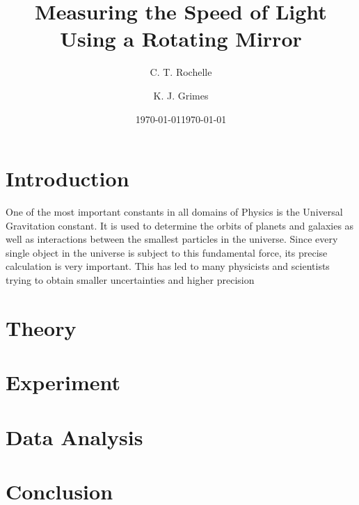 \documentclass[aps,prl,10pt,twocolumn,floatfix]{revtex4-2}
\begin{document}


\title{Measuring the Speed of Light Using a Rotating Mirror}
\author{C. T. Rochelle}
\author{K. J. Grimes}
\date{\today}
\date{\today}

\maketitle

\section{Introduction}\label{Intro}
One of the most important constants in all domains of Physics is the Universal Gravitation constant. 
It is used to determine the orbits of planets and galaxies as well as interactions between the smallest particles in the universe.
Since every single object in the universe is subject to this fundamental force, its precise calculation is very important.
This has led to many physicists and scientists trying to obtain smaller uncertainties and higher precision


\section{Theory}\label{Theory}


\section{Experiment}





\section{Data Analysis}


\section{Conclusion}


\end{document}
